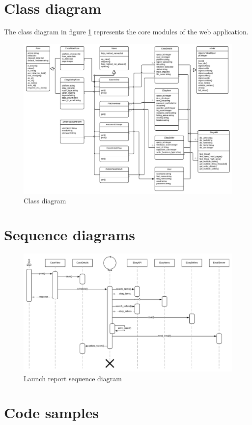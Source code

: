 \section{Class diagram}
The class diagram in figure \ref{fig:clssdiag} represents the core modules of
the web application.

\begin{figure}[h!]
\centering
\includegraphics[angle=90, scale=0.9]{imgs/ClassDiag.pdf}
\caption{Class diagram}
\label{fig:clssdiag}
\end{figure}

\section{Sequence diagrams}

\begin{figure}[h!]
\centering
\includegraphics[angle=90, scale=0.6]{imgs/SequenceDiagram.pdf}
\caption{Launch report sequence diagram}
\label{fig:sqncdiag}
\end{figure}

\section{Code samples}

